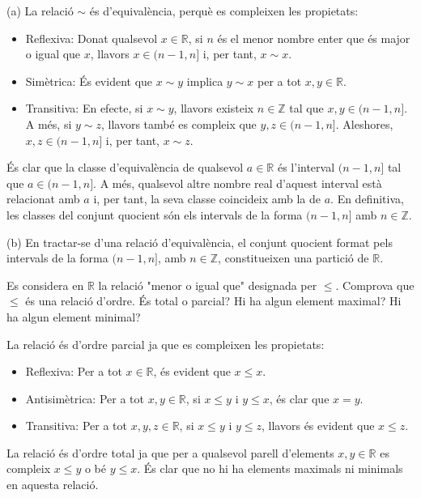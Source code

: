 \begin{solucio}
(a) La relaci\'{o} $\sim $ \'{e}s d'equival\`{e}ncia, perqu\`{e} es
compleixen les propietats:

\begin{itemize}
\item Reflexiva: Donat qualsevol $x\in \mathbb{R}$, si $n$ \'{e}s el menor
nombre enter que \'{e}s major o igual que $x$, llavors $x\in (n-1,n]$ i, per
tant, $x\sim x$.

\item Sim\`{e}trica: \'{E}s evident que $x\sim y$ implica $y\sim x$ per a
tot $x,y\in \mathbb{R}$.

\item Transitiva: En efecte, si $x\sim y$, llavors existeix $n\in \mathbb{Z}$
tal que $x,y\in (n-1,n]$. A m\'{e}s, si $y\sim z$, llavors tamb\'{e} es
compleix que $y,z\in (n-1,n]$. Aleshores, $x,z\in (n-1,n]$ i, per tant, $%
x\sim z$.
\end{itemize}

\'{E}s clar que la classe d'equival\`{e}ncia de qualsevol $a\in \mathbb{R}$
\'{e}s l'interval $(n-1,n]$ tal que $a\in (n-1,n]$. A m\'{e}s, qualsevol
altre nombre real d'aquest interval est\`{a} relacionat amb $a$ i, per tant,
la seva classe coincideix amb la de $a$. En definitiva, les classes del
conjunt quocient s\'{o}n els intervals de la forma $(n-1,n]$ amb $n\in
\mathbb{Z}$.

(b) En tractar-se d'una relaci\'{o} d'equival\`{e}ncia, el conjunt quocient
format pels intervals de la forma $(n-1,n]$, amb $n\in \mathbb{Z}$,
constitueixen una partici\'{o} de $\mathbb{R}$.
\end{solucio}

\begin{exercici}
Es considera en $\mathbb{R}$ la relaci\'{o} "menor o igual que" designada
per $\leq $. Comprova que $\leq $ \'{e}s una relaci\'{o} d'ordre. \'{E}s
total o parcial? Hi ha algun element maximal? Hi ha algun element minimal?
\end{exercici}

\begin{solucio}
La relaci\'{o} \'{e}s d'ordre parcial ja que es compleixen les propietats:

\begin{itemize}
\item Reflexiva: Per a tot $x\in \mathbb{R}$, \'{e}s evident que $x\leq x$.

\item Antisim\`{e}trica: Per a tot $x,y\in \mathbb{R}$, si $x\leq y$ i $%
y\leq x$, \'{e}s clar que $x=y$.

\item Transitiva: Per a tot $x,y,z\in \mathbb{R}$, si $x\leq y$ i $y\leq z$,
llavors \'{e}s evident que $x\leq z$.
\end{itemize}

La relaci\'{o} \'{e}s d'ordre total ja que per a qualsevol parell d'elements
$x,y\in \mathbb{R}$ es compleix $x\leq y$ o b\'{e} $y\leq x$. \'{E}s clar
que no hi ha elements maximals ni minimals en aquesta relaci\'{o}.
\end{solucio}

